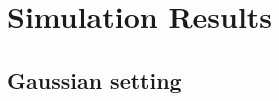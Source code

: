 \documentclass[12pt]{article} %
\begin{document}

\section{Simulation Results\label{sec:Simulation Results}}
\subsection{Gaussian setting\label{subsec:GaussianSet}}
\end{document}

